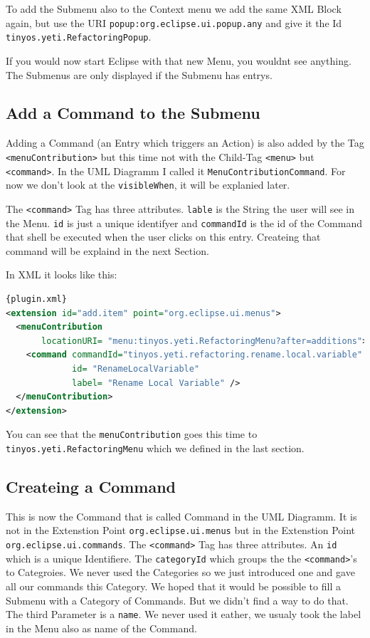 \documentclass[a4paper,10pt]{report}
\begin{document}
To add the Submenu also to the Context menu we add the same XML Block again, but use the URI \verb!popup:org.eclipse.ui.popup.any! and give it the Id \verb!tinyos.yeti.RefactoringPopup!.

If you would now start Eclipse with that new Menu, you wouldnt see anything. The Submenus are only displayed if the Submenu has entrys.
\subsection{Add a Command to the Submenu}
Adding a Command (an Entry which triggers an Action) is also added by the Tag \verb!<menuContribution>! but this time not with the Child-Tag \verb!<menu>! but \verb!<command>!.
In the UML Diagramm I called it \verb!MenuContributionCommand!. For now we don't look at the \verb!visibleWhen!, it will be explanied later.

The \verb!<command>! Tag has three attributes. \verb!lable! is the String the user will see in the Menu. \verb!id! is just a unique identifyer and \verb!commandId! is the 
id of the Command that shell be executed when the user clicks on this entry. Createing that command will be explaind in the next Section.

In XML it looks like this:
\begin{lstlisting}[language=XML,caption=Adding a Command to Menu ({\it plugin.xml})]{plugin.xml}
<extension id="add.item" point="org.eclipse.ui.menus">
  <menuContribution
       locationURI= "menu:tinyos.yeti.RefactoringMenu?after=additions">
    <command commandId="tinyos.yeti.refactoring.rename.local.variable"
             id= "RenameLocalVariable"
             label= "Rename Local Variable" />
  </menuContribution>
</extension>
\end{lstlisting}
You can see that the \verb!menuContribution! goes this time to \verb!tinyos.yeti.RefactoringMenu! which we defined in the last section.

\subsection{Createing a Command}
This is now the Command that is called Command in the UML Diagramm. It is not in the Extenstion Point \verb!org.eclipse.ui.menus! but in the Extenstion Point \verb!org.eclipse.ui.commands!. 
The \verb!<command>! Tag has three attributes. An \verb!id! which is a unique Identifiere. The \verb!categoryId! which groups the the \verb!<command>!'s to Categroies.
We never used the Categories so we just introduced one and gave all our commands this Category. We hoped that it would be possible to fill a Submenu with a Category of Commands.
But we didn't find a way to do that. The third Parameter is a \verb!name!. We never used it eather, we usualy took the label in the Menu also as name of the Command.
\end{document}
